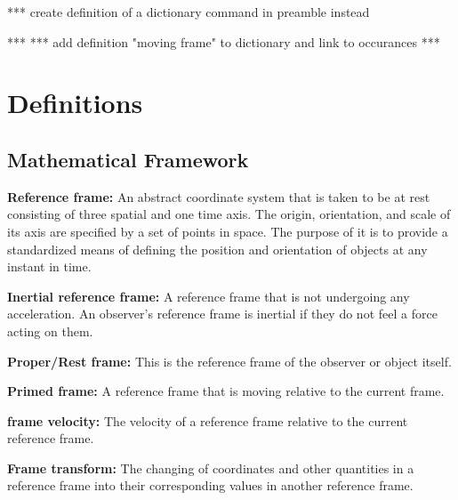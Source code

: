 
*** create definition of a dictionary command in preamble instead

***
*** add definition "moving frame" to dictionary and link to occurances
***

\section{Definitions}

\subsection{Mathematical Framework}%

\linesep

\noindent \hypertarget{def-Reference-frame}{\textbf{Reference frame:}}
An abstract coordinate system that is taken to be at rest consisting of three spatial and one time axis. The origin, orientation, and scale of its axis are specified by a set of points in space. The purpose of it is to provide a standardized means of defining the position and orientation of objects at any instant in time.

\linesep

\noindent \hypertarget{def-Inertial-reference-frame}{\textbf{Inertial reference frame:}}
A reference frame that is not undergoing any acceleration. An observer's reference frame is inertial if they do not feel a force acting on them.

\linesep

\noindent \hypertarget{def-proper-frame}{\textbf{Proper/Rest frame:}}
This is the reference frame of the observer or object itself.

\linesep


\noindent \hypertarget{def-Primed-Frame}{\textbf{Primed frame:}}
A reference frame that is moving relative to the current frame.

\linesep

\noindent \hypertarget{def-frame-velocity}{\textbf{frame velocity:}}
The velocity of a reference frame relative to the current reference frame.

\linesep

\noindent \hypertarget{def-transform}{\textbf{Frame transform:}}
The changing of coordinates and other quantities in a reference frame into their corresponding values in another reference frame.

